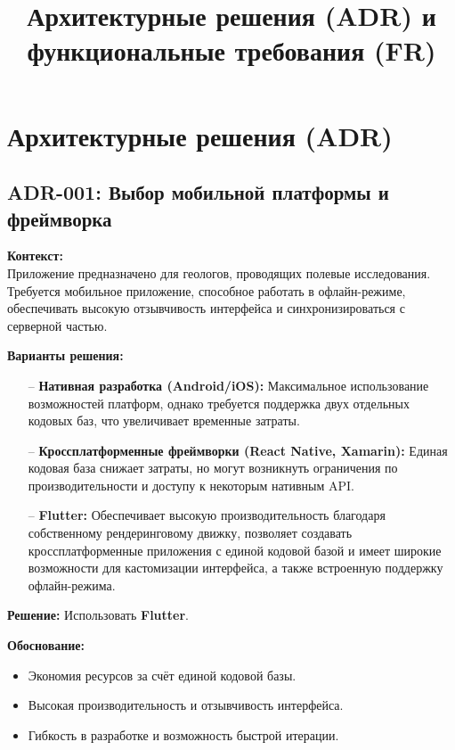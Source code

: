 \documentclass[a4paper,12pt]{article}
\title{Архитектурные решения (ADR) и функциональные требования (FR)}
\begin{document}
\maketitle
\tableofcontents
\newpage

\section{Архитектурные решения (ADR)}

\subsection{ADR-001: Выбор мобильной платформы и фреймворка}

\textbf{Контекст:}\\
Приложение предназначено для геологов, проводящих полевые исследования. Требуется мобильное приложение, способное работать в офлайн-режиме, обеспечивать высокую отзывчивость интерфейса и синхронизироваться с серверной частью.

\textbf{Варианты решения:}
\begin{itemize}[leftmargin=2cm]
    \item[--] \textbf{Нативная разработка (Android/iOS):} Максимальное использование возможностей платформ, однако требуется поддержка двух отдельных кодовых баз, что увеличивает временные затраты.
    \item[--] \textbf{Кроссплатформенные фреймворки (React Native, Xamarin):} Единая кодовая база снижает затраты, но могут возникнуть ограничения по производительности и доступу к некоторым нативным API.
    \item[--] \textbf{Flutter:} Обеспечивает высокую производительность благодаря собственному рендеринговому движку, позволяет создавать кроссплатформенные приложения с единой кодовой базой и имеет широкие возможности для кастомизации интерфейса, а также встроенную поддержку офлайн-режима.
\end{itemize}

\textbf{Решение:} Использовать \textbf{Flutter}.

\textbf{Обоснование:}
\begin{itemize}
    \item Экономия ресурсов за счёт единой кодовой базы.
    \item Высокая производительность и отзывчивость интерфейса.
    \item Гибкость в разработке и возможность быстрой итерации.
\end{itemize}
\end{document}
